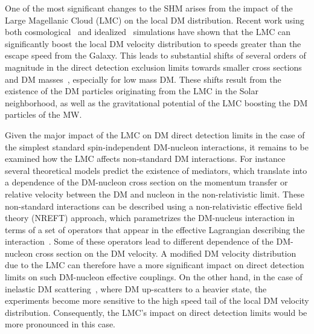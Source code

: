 \documentclass[a4paper,11pt]{article}
\begin{document}
One of the most significant changes to the SHM arises from the impact of the Large Magellanic Cloud (LMC) on the local DM distribution. Recent work using both  cosmological~\cite{Smith-Orlik:2023kyl} and idealized~\cite{Besla:2019xbx, Donaldson:2021byu} simulations have shown that the LMC can significantly boost the local DM velocity distribution to speeds greater than the escape speed from the Galaxy. This leads to substantial shifts of several orders of magnitude in the direct detection exclusion limits towards smaller cross sections and DM masses~\cite{Smith-Orlik:2023kyl}, especially for low mass DM. These shifts result from the existence of the DM particles originating from the LMC in the Solar neighborhood, as well as the gravitational potential of the LMC boosting the DM particles of the MW.

Given the major impact of the LMC on DM direct detection limits in the case of the simplest standard spin-independent DM-nucleon interactions, it remains to be examined how the LMC affects non-standard DM interactions. For instance several theoretical models predict the existence of mediators, which translate into a dependence of the DM-nucleon cross section on the momentum transfer or relative velocity between the DM and nucleon in the non-relativistic limit. These non-standard interactions can be described using a non-relativistic effective field theory (NREFT) approach, which  parametrizes the DM-nucleus interaction in terms of a set of operators that appear in the effective Lagrangian describing the interaction~\cite{Fan:2010gt, Fitzpatrick:2012ix, Fitzpatrick:2012ib, Anand:2013yka, Dent:2015zpa}. Some of these operators lead to different dependence of the DM-nucleon cross section on the DM velocity. A modified DM velocity distribution due to the LMC can therefore have a more significant impact on direct detection limits on such DM-nucleon effective couplings. On the other hand, in the case of inelastic DM scattering~\cite{Tucker-Smith:2001myb}, where DM up-scatters to a heavier state, the experiments become more sensitive to the high speed tail of the local DM velocity distribution. Consequently, the LMC's impact on direct detection limits would be more pronounced in this case.
\end{document}
